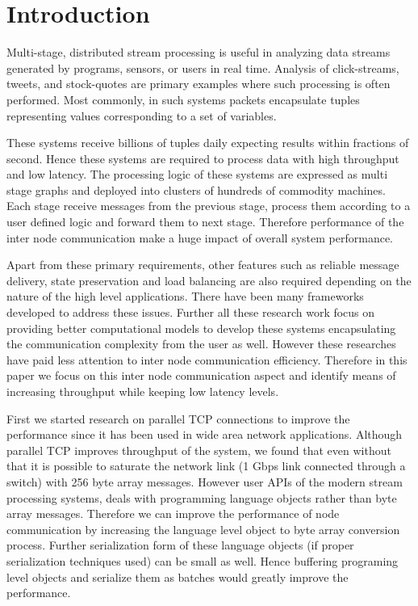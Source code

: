 \section{Introduction}

Multi-stage, distributed stream processing is useful in analyzing data streams generated by programs, sensors, or users in real time. Analysis of click-streams, tweets, and stock-quotes are primary examples where such processing is often performed. Most commonly, in such systems packets encapsulate tuples representing values corresponding to a set of variables. 

These systems receive billions of tuples daily expecting results within fractions of second. Hence these systems are required to process data with high throughput and low latency. The processing logic of these systems are expressed as multi stage graphs and deployed into clusters of hundreds of commodity machines. Each stage receive messages from the previous stage, process them according to a user defined logic and forward them to next stage. Therefore performance of the inter node communication make a huge impact of overall system performance.  

Apart from these primary requirements, other features such as reliable message delivery,  state preservation and load balancing are also required depending on the nature of the high level applications. There have been many frameworks \cite{toshniwal2014storm} \cite{zaharia2010spark} \cite{akidau2013millwheel} \cite{murray2013naiad} developed to address these issues. Further all these research work focus on providing better computational models to develop these systems encapsulating the communication complexity from the user as well.  However these researches have paid less attention to inter node communication efficiency. Therefore in this paper we focus on this inter node communication aspect and identify means of increasing throughput while keeping low latency levels.

First we started research on parallel TCP connections \cite{hacker2001end} to improve the performance since it has been used in wide area network applications. Although parallel TCP improves throughput of the system, we found that even without that it is possible to saturate the network link (1 Gbps link connected through a switch) with 256 byte array messages. However user APIs of the modern stream processing systems, deals with programming language objects rather than byte array messages. Therefore we can improve the performance of node communication by increasing the language level object to byte array conversion process. Further serialization form of these language objects (if proper serialization techniques used) can be small as well. Hence buffering programing level objects and serialize them as batches would greatly improve the performance. 

